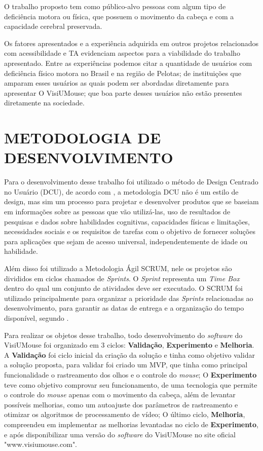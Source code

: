 O trabalho proposto tem como público-alvo pessoas com algum tipo de deficiência motora ou física, que possuem o movimento da cabeça e com a capacidade cerebral preservada.

Os fatores apresentados e a experiência adquirida em outros projetos relacionados com acessibilidade e TA evidenciam aspectos para a viabilidade do trabalho apresentado. Entre as experiências podemos citar a quantidade de usuários com deficiência físico motora no Brasil e na região de Pelotas; de instituições que amparam esses usuários as quais podem ser abordadas diretamente para apresentar O VisiUMouse; que boa parte desses usuários não estão presentes diretamente na sociedade.

\section{METODOLOGIA DE DESENVOLVIMENTO}\label{Sub:metodologia-desenvolvimento}
Para o desenvolvimento desse trabalho foi utilizado o método de Design Centrado no Usuário (DCU), de acordo com \cite{GREENHOUSE2010}, a metodologia DCU não é um estilo de design, mas sim um processo para projetar e desenvolver produtos que se baseiam em informações sobre as pessoas que vão utilizá-las, uso de resultados de pesquisas e dados sobre habilidades cognitivas, capacidades físicas e limitações, necessidades sociais e os requisitos de tarefas com o objetivo de fornecer soluções para aplicações que sejam de acesso universal, independentemente de idade ou habilidade. 

Além disso foi utilizado a Metodologia Ágil SCRUM, nele os projetos são divididos em ciclos chamados de \textit{Sprints}. O \textit{Sprint} representa um \textit{Time Box} dentro do qual um conjunto de atividades deve ser executado. O SCRUM foi utilizado principalmente para organizar a prioridade das \textit{Sprints} relacionadas ao desenvolvimento, para garantir as datas de entrega e a organização do tempo disponível, segundo .

Para realizar os objetos desse trabalho, todo desenvolvimento do \textit{software} do VisiUMouse foi organizado em 3 ciclos: \textbf{Validação}, \textbf{Experimento} e \textbf{Melhoria}. A \textbf{Validação} foi ciclo inicial da criação da solução e tinha como objetivo validar a solução proposta, para validar foi criado um MVP, que tinha como principal funcionalidade o rastreamento dos olhos e o controle do \textit{mouse}; O \textbf{Experimento} teve como objetivo comprovar seu funcionamento, de uma tecnologia que permite o controle do \textit{mouse} apenas com o movimento da cabeça, além de levantar possíveis melhorias, como um autoajuste dos parâmetros de rastreamento e otimizar os algoritmos de processamento de vídeo; O último ciclo, \textbf{Melhoria},  compreendeu em implementar as melhorias levantadas no ciclo de \textbf{Experimento}, e após disponibilizar uma versão do \textit{software} do VisiUMouse no site oficial "www.visiumouse.com".


